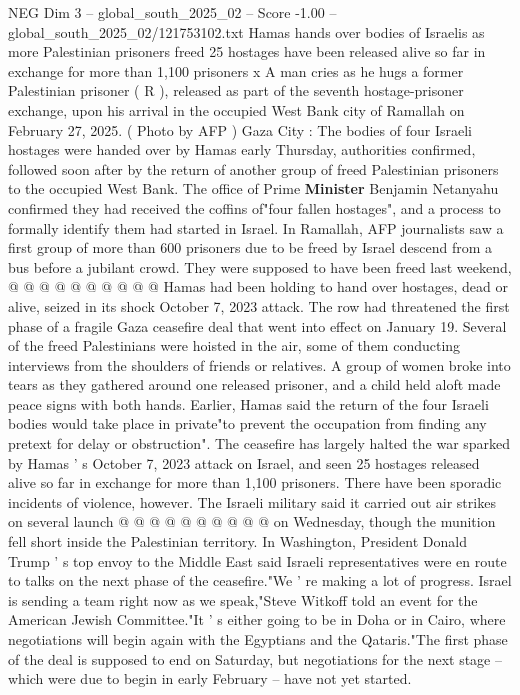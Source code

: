 \begin{textsample}{NEG Dim 3 – global\_south\_2025\_02 – Score -1.00 – global\_south\_2025\_02/121753102.txt}  \label{ex:f3_neg_005}
Hamas hands over bodies of Israelis as more Palestinian prisoners freed 25 hostages have been released alive so far in exchange for more than 1,100 prisoners x A man cries as he hugs a former Palestinian prisoner ( R ), released as part of the seventh hostage-prisoner exchange, upon his arrival in the occupied West Bank city of Ramallah on February 27, 2025. ( Photo by AFP ) Gaza City : The bodies of four Israeli hostages were handed over by Hamas early Thursday, authorities confirmed, followed soon after by the return of another group of freed Palestinian prisoners to the occupied West Bank.
The office of Prime \textbf{Minister} Benjamin Netanyahu confirmed they had received the coffins of"four fallen hostages", and a process to formally identify them had started in Israel.
In Ramallah, AFP journalists saw a first group of more than 600 prisoners due to be freed by Israel descend from a bus before a jubilant crowd.
They were supposed to have been freed last weekend, @ @ @ @ @ @ @ @ @ @ Hamas had been holding to hand over hostages, dead or alive, seized in its shock October 7, 2023 attack.
The row had threatened the first phase of a fragile Gaza ceasefire deal that went into effect on January 19.
Several of the freed Palestinians were hoisted in the air, some of them conducting interviews from the shoulders of friends or relatives.
A group of women broke into tears as they gathered around one released prisoner, and a child held aloft made peace signs with both hands.
Earlier, Hamas said the return of the four Israeli bodies would take place in private"to prevent the occupation from finding any pretext for delay or obstruction".
The ceasefire has largely halted the war sparked by Hamas ' s October 7, 2023 attack on Israel, and seen 25 hostages released alive so far in exchange for more than 1,100 prisoners.
There have been sporadic incidents of violence, however.
The Israeli military said it carried out air strikes on several launch @ @ @ @ @ @ @ @ @ @ on Wednesday, though the munition fell short inside the Palestinian territory.
In Washington, President Donald Trump ' s top envoy to the Middle East said Israeli representatives were en route to talks on the next phase of the ceasefire."We ' re making a lot of progress.
Israel is sending a team right now as we speak,"Steve Witkoff told an event for the American Jewish Committee."It ' s either going to be in Doha or in Cairo, where negotiations will begin again with the Egyptians and the Qataris."The first phase of the deal is supposed to end on Saturday, but negotiations for the next stage -- which were due to begin in early February -- have not yet started.

\end{textsample}
